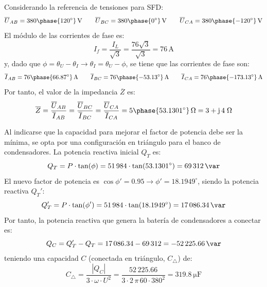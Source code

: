 Considerando la referencia de tensiones para SFD:
\begin{equation*}
    \overline{U}_{AB}=380\phase{120^\circ}\,\si{\volt}\qquad 
    \overline{U}_{BC}=380\phase{0^\circ}\,\si{\volt}\qquad 
    \overline{U}_{CA}=380\phase{-120^\circ}\,\si{\volt}
\end{equation*}
El módulo de las corrientes de fase es:
\begin{equation*}
    I_f=\dfrac{I_L}{\sqrt{3}}=\dfrac{76\sqrt{3}}{\sqrt{3}}=76\,\si{\ampere}
\end{equation*}
y, dado que $\phi=\theta_U-\theta_I\rightarrow \theta_I=\theta_U-\phi$, se tiene que las corrientes de fase son: 
\begin{equation*}
    \overline{I}_{AB}=76\phase{66.87^\circ}\,\si{\ampere}\qquad 
    \overline{I}_{BC}=76\phase{-53.13^\circ}\,\si{\ampere}\qquad 
    \overline{I}_{CA}=76\phase{-173.13^\circ}\,\si{\ampere}
\end{equation*}
Por tanto, el valor de la impedancia $\overline{Z}$ es: 
\begin{equation*}
    \overline{Z}=\dfrac{\overline{U}_{AB}}{\overline{I}_{AB}}=\dfrac{\overline{U}_{BC}}{\overline{I}_{BC}}=\dfrac{\overline{U}_{CA}}{\overline{I}_{CA}}=5\phase{53.1301^\circ}\,\Omega={3+\mathrm{j}\,4}\;\Omega
\end{equation*}

Al indicarse que la capacidad para mejorar el factor de potencia debe ser la {mínima}, se opta por una configuración en {triángulo} para el banco de condensadores. La potencia reactiva inicial $Q_T$ es:
\begin{equation*}
    Q_T=P\cdot \tan(\phi)=51\,984\cdot \tan(53.1301^\circ)=\qty{69312}{\var}
\end{equation*}
El nuevo factor de potencia es $\cos{\phi'}=0.95\rightarrow\phi'=18.1949^\circ$, siendo la potencia reactiva $Q_T'$:
\begin{equation*}
    Q_T'=P\cdot \tan(\phi')=51\,984\cdot \tan(18.1949^\circ)=\qty{17086.34}{\var}
\end{equation*}
Por tanto, la potencia reactiva que genera la batería de condensadores a conectar es: 
\begin{equation*}
    Q_C=Q_T'-Q_T=17\,086.34-69\,312=\qty{-52225.66}{\var}
\end{equation*}
teniendo una capacidad $C$ (conectada en triángulo, $C_{\triangle}$) de:
\begin{equation*}
    C_{\triangle}=\dfrac{|Q_C|}{3\cdot\omega\cdot U^2}=\dfrac{52\,225.66}{3\cdot 2\,\pi\, 60\cdot 380^2}= \qty{319.8}{\micro\farad}
\end{equation*}




